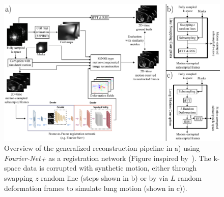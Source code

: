\begin{figure}[h] %
	\centering
	\includegraphics[width=\linewidth]{./Images/GeneralReconstructionPipeline.pdf} 
	\caption{Overview of the generalized reconstruction pipeline in a) using \emph{Fourier-Net+} as a registration network (Figure inspired by~\cite{Kuestner2022}). The k-space data is corrupted with synthetic motion, either through swapping $z$ random line (steps shown in b) or by via $L$ random deformation frames to simulate lung motion (shown in c)).}
	\label{fig:GeneralReconstructionPipeline}
\end{figure}
